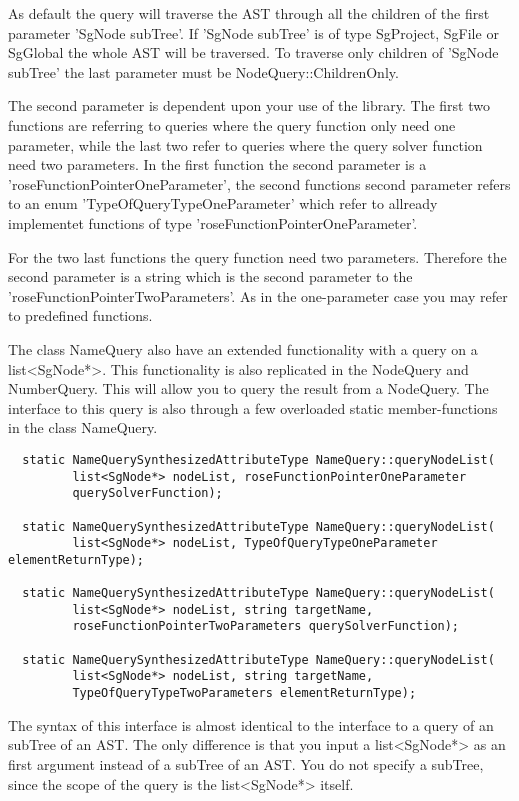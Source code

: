 {As default the query will traverse the AST through all the children of the
first parameter 'SgNode subTree'. If 'SgNode subTree' is of type SgProject, 
SgFile or SgGlobal the whole AST will be traversed. To traverse only children
of 'SgNode subTree' the last parameter must be NodeQuery::ChildrenOnly. 

The second parameter is dependent upon your use of the library. The
first two functions are referring to queries where the query function
only need one parameter, while the last two refer to queries where the 
query solver function need two parameters. In the first function the second
parameter is a 'roseFunctionPointerOneParameter', the second functions
second parameter refers to an enum 'TypeOfQueryTypeOneParameter' which 
refer to allready implementet functions of type 
'roseFunctionPointerOneParameter'. 

For the two last functions the query function need two
parameters. Therefore the second parameter is a string which is the
second parameter to the 'roseFunctionPointerTwoParameters'. As in the
one-parameter case you may refer to predefined functions.

The class NameQuery also have an extended functionality with a query
on a list<SgNode*>. This functionality is also replicated in the
NodeQuery and NumberQuery. This will allow you to query the result
from a NodeQuery. The interface to this query is also through a few
overloaded static member-functions in the class NameQuery.
\begin{verbatim}
  static NameQuerySynthesizedAttributeType NameQuery::queryNodeList(
         list<SgNode*> nodeList, roseFunctionPointerOneParameter
         querySolverFunction);

  static NameQuerySynthesizedAttributeType NameQuery::queryNodeList(
         list<SgNode*> nodeList, TypeOfQueryTypeOneParameter elementReturnType);
	  
  static NameQuerySynthesizedAttributeType NameQuery::queryNodeList(
         list<SgNode*> nodeList, string targetName, 
         roseFunctionPointerTwoParameters querySolverFunction);  

  static NameQuerySynthesizedAttributeType NameQuery::queryNodeList(
         list<SgNode*> nodeList, string targetName, 
         TypeOfQueryTypeTwoParameters elementReturnType);
\end{verbatim}
The syntax of this interface is almost identical to the interface to a query
of an subTree of an AST.  The only difference is that you input a
list<SgNode*> as an first argument instead of a subTree of an AST. You
do not specify a subTree, since the scope of the query is the list<SgNode*> itself.  
 


}

